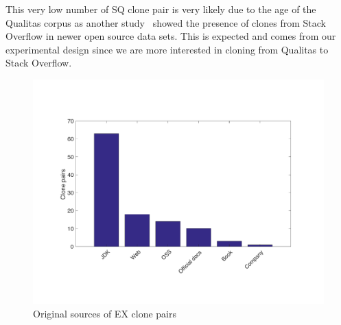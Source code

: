 \documentclass[10pt,journal,compsoc]{IEEEtran}
\begin{document}
This very low number of SQ clone pair is very likely due to the age of the
Qualitas corpus as another study~\cite{An2017} showed the presence of clones
from Stack Overflow in newer open source data sets. This is expected and
comes from our experimental design since
we are more interested in cloning from Qualitas to Stack Overflow.

\begin{figure}
	\centering
	\includegraphics[width=0.9\linewidth]{ex_sources}
	\caption{Original sources of EX clone pairs}
	\label{fig:ex_sources}
\end{figure}
\end{document}
